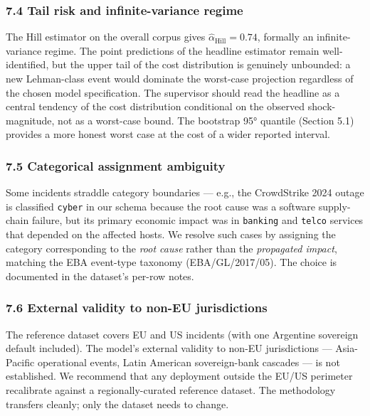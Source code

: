 \documentclass[
]{article}
\begin{document}
\subsubsection{7.4 Tail risk and infinite-variance
regime}\label{tail-risk-and-infinite-variance-regime}

The Hill estimator on the overall corpus gives
\(\hat{\alpha}_{\text{Hill}} = 0.74\), formally an infinite-variance
regime. The point predictions of the headline estimator remain
well-identified, but the upper tail of the cost distribution is
genuinely unbounded: a new Lehman-class event would dominate the
worst-case projection regardless of the chosen model specification. The
supervisor should read the headline as a central tendency of the cost
distribution conditional on the observed shock-magnitude, not as a
worst-case bound. The bootstrap 95° quantile (Section 5.1) provides a
more honest worst case at the cost of a wider reported interval.

\subsubsection{7.5 Categorical assignment
ambiguity}\label{categorical-assignment-ambiguity}

Some incidents straddle category boundaries --- e.g., the CrowdStrike
2024 outage is classified \texttt{cyber} in our schema because the root
cause was a software supply-chain failure, but its primary economic
impact was in \texttt{banking} and \texttt{telco} services that depended
on the affected hosts. We resolve such cases by assigning the category
corresponding to the \emph{root cause} rather than the \emph{propagated
impact}, matching the EBA event-type taxonomy (EBA/GL/2017/05). The
choice is documented in the dataset's per-row notes.

\subsubsection{7.6 External validity to non-EU
jurisdictions}\label{external-validity-to-non-eu-jurisdictions}

The reference dataset covers EU and US incidents (with one Argentine
sovereign default included). The model's external validity to non-EU
jurisdictions --- Asia-Pacific operational events, Latin American
sovereign-bank cascades --- is not established. We recommend that any
deployment outside the EU/US perimeter recalibrate against a
regionally-curated reference dataset. The methodology transfers cleanly;
only the dataset needs to change.
\end{document}
